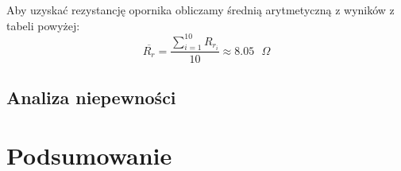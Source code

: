\documentclass[a4paper,12pts]{article}
\begin{document}
	Aby uzyskać rezystancję opornika obliczamy średnią arytmetyczną z wyników z tabeli powyżej:
	\begin{equation}
	\overline{R_{r}} = \frac{\sum_{i = 1}^{10} R_{{r}_i}}{10} \approx 8.05 \textrm{ $\Omega$}
	\end{equation}
	
	
	\subsection{Analiza niepewności}
	

	\section{Podsumowanie}

\end{document}
